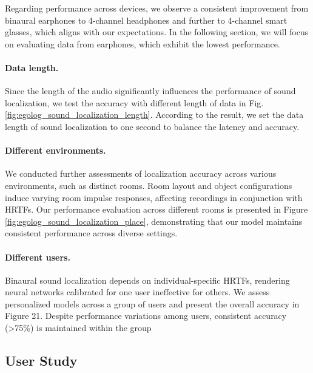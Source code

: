 Regarding performance across devices, we observe a consistent improvement from binaural earphones to 4-channel headphones and further to 4-channel smart glasses, which aligns with our expectations. In the following section, we will focus on evaluating data from earphones, which exhibit the lowest performance.

\paragraph{Data length.}
Since the length of the audio significantly influences the performance of sound localization, we test the accuracy with different length of data in Fig. \ref{fig:egolog_sound_localization_length}. According to the result, we set the data length of sound localization to one second to balance the latency and accuracy.

\paragraph{Different environments.}
We conducted further assessments of localization accuracy across various environments, such as distinct rooms. Room layout and object configurations induce varying room impulse responses, affecting recordings in conjunction with HRTFs. Our performance evaluation across different rooms is presented in Figure \ref{fig:egolog_sound_localization_place}, demonstrating that our model maintains consistent performance across diverse settings.

\paragraph{Different users.}
Binaural sound localization depends on individual-specific HRTFs, rendering neural networks calibrated for one user
ineffective for others. We assess personalized models across a group of users and present the overall accuracy in Figure 21. Despite performance variations among users, consistent accuracy (>75\%) is maintained within the group

\subsection{User Study}


